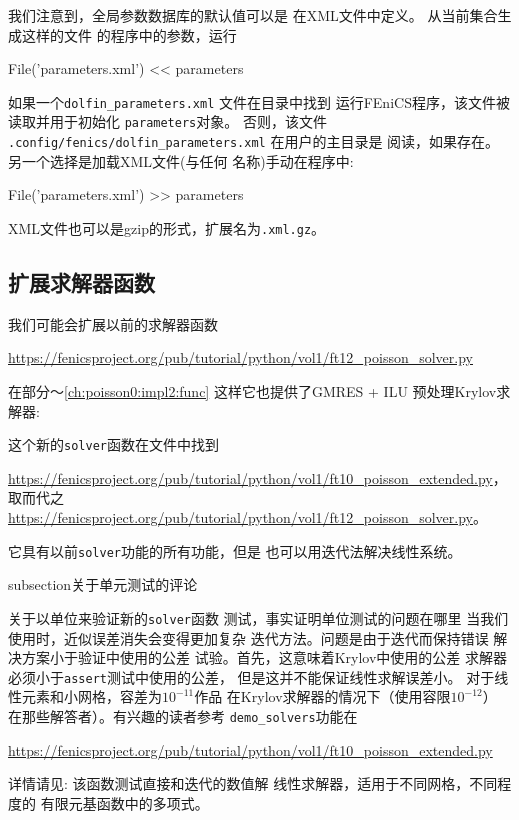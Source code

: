 我们注意到，全局参数数据库的默认值可以是
在XML文件中定义。 从当前集合生成这样的文件
的程序中的参数，运行

\begin{python}
File('parameters.xml') << parameters
\end{python}
如果一个\verb!dolfin_parameters.xml! 文件在目录中找到
运行FEniCS程序，该文件被读取并用于初始化
\texttt{parameters}对象。 否则，该文件
\verb!.config/fenics/dolfin_parameters.xml!
在用户的主目录是
阅读，如果存在。 另一个选择是加载XML文件(与任何
名称)手动在程序中:

\begin{python}
File('parameters.xml') >> parameters
\end{python}
XML文件也可以是gzip的形式，扩展名为\texttt{.xml.gz}。

\subsection{扩展求解器函数}

我们可能会扩展以前的求解器函数
\begin{center}
\url{https://fenicsproject.org/pub/tutorial/python/vol1/ft12_poisson_solver.py}
\end{center}
在部分〜\ref{ch:poisson0:impl2:func}
这样它也提供了GMRES + ILU
预处理Krylov求解器:


这个新的\texttt{solver}函数在文件中找到
\begin{center}
\url{https://fenicsproject.org/pub/tutorial/python/vol1/ft10_poisson_extended.py}，
取而代之
\url{https://fenicsproject.org/pub/tutorial/python/vol1/ft12_poisson_solver.py}。
\end{center}
它具有以前\texttt{solver}功能的所有功能，但是
也可以用迭代法解决线性系统。

subsection{关于单元测试的评论}

关于以单位来验证新的\texttt{solver}函数
测试，事实证明单位测试的问题在哪里
当我们使用时，近似误差消失会变得更加复杂
迭代方法。问题是由于迭代而保持错误
解决方案小于验证中使用的公差
试验。首先，这意味着Krylov中使用的公差
求解器必须小于\texttt{assert}测试中使用的公差，
但是这并不能保证线性求解误差小。
对于线性元素和小网格，容差为$10^{-11}$作品
在Krylov求解器的情况下（使用容限$10^{-12}$）
在那些解答者）。有兴趣的读者参考
\verb!demo_solvers!功能在
\begin{center}
\url{https://fenicsproject.org/pub/tutorial/python/vol1/ft10_poisson_extended.py}
\end{center}
详情请见:
该函数测试直接和迭代的数值解
线性求解器，适用于不同网格，不同程度的
有限元基函数中的多项式。

